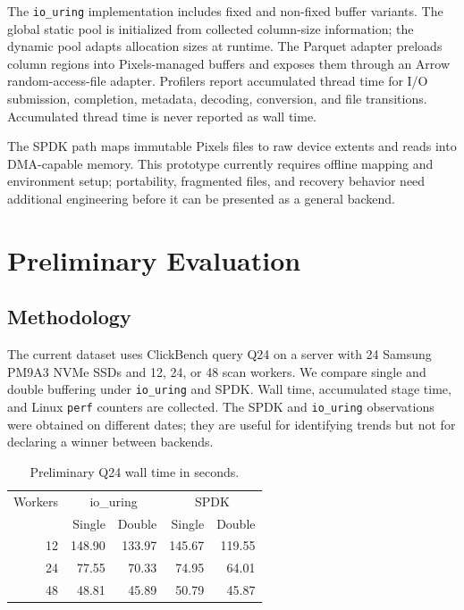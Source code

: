 \documentclass[conference]{IEEEtran}
\begin{document}
The \texttt{io\_uring} implementation includes fixed and non-fixed buffer
variants.  The global static pool is initialized from collected column-size
information; the dynamic pool adapts allocation sizes at runtime.  The Parquet
adapter preloads column regions into Pixels-managed buffers and exposes them
through an Arrow random-access-file adapter.  Profilers report accumulated
thread time for I/O submission, completion, metadata, decoding, conversion,
and file transitions.  Accumulated thread time is never reported as wall time.

The SPDK path maps immutable Pixels files to raw device extents and reads into
DMA-capable memory.  This prototype currently requires offline mapping and
environment setup; portability, fragmented files, and recovery behavior need
additional engineering before it can be presented as a general backend.

\section{Preliminary Evaluation}
\label{sec:evaluation}

\subsection{Methodology}

The current dataset uses ClickBench query Q24 on a server with 24 Samsung
PM9A3 NVMe SSDs and 12, 24, or 48 scan workers.  We compare single and double
buffering under \texttt{io\_uring} and SPDK.  Wall time, accumulated stage
time, and Linux \texttt{perf} counters are collected.  The SPDK and
\texttt{io\_uring} observations were obtained on different dates; they are
useful for identifying trends but not for declaring a winner between backends.

\begin{table}[t]
\caption{Preliminary Q24 wall time in seconds.}
\label{tab:wall}
\centering
\begin{tabular}{rrrrr}
\toprule
Workers & \multicolumn{2}{c}{io\_uring} & \multicolumn{2}{c}{SPDK} \\
& Single & Double & Single & Double \\
\midrule
12 & 148.90 & 133.97 & 145.67 & 119.55 \\
24 & 77.55  & 70.33  & 74.95  & 64.01  \\
48 & 48.81  & 45.89  & 50.79  & 45.87  \\
\bottomrule
\end{tabular}
\end{table}
\end{document}
